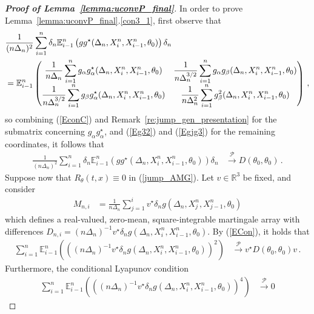 \documentclass[11pt,a4paper]{article}
\newcommand{\xtl}{{X^n_{i-1}}}
\newcommand{\xtr}{X^n_i}
\newcommand{\xtlj}{{X^n_{j-1}}}
\newcommand{\xtrj}{X^n_j}
\newcommand{\thetan}{{\theta_0}}
\newcommand{\EE}{{\mathbb E}}
\newcommand{\RR}{{\mathbb R}}
\newcommand{\pp}{{\mathcal{P}}}
\numberwithin{equation}{section}
\numberwithin{theorem}{section}
\begin{document}
\begin{proof}[\textbf{Proof of Lemma~\ref{lemma:uconvP_final}}]
In order to prove Lemma~\ref{lemma:uconvP_final}.\ref{con3_1}, first observe that
\begin{align*}
&\hspace{0mm} \frac{1}{(n\Delta_n)^2}\sum_{i=1}^n \delta_n \EE^n_{i-1}\left( gg^\star (\Delta_n,\xtr, \xtl,
  \thetan)\right) \delta_n\\
&= \EE^n_{i-1}\begin{pmatrix} \displaystyle \frac{1}{n\Delta_n}  \sum_{i=1}^n   g_\alpha   g_\alpha^\star  (\Delta_n,\xtr, \xtl,
  \thetan) & \displaystyle \frac{1}{n\Delta_n^{3/2}} \sum_{i=1}^n  g_\alpha   g_\beta  (\Delta_n,\xtr, \xtl,
  \thetan)\\
\displaystyle \frac{1}{n\Delta_n^{3/2}}   \sum_{i=1}^n   g_\beta g_\alpha^\star  (\Delta_n,\xtr, \xtl,
  \thetan) & \displaystyle \frac{1}{n\Delta_n^2} \sum_{i=1}^n   g_\beta^2  (\Delta_n,\xtr, \xtl,
  \thetan)
\end{pmatrix}   \,,
\end{align*}
%
so combining (\ref{EconC}) and Remark~\ref{re:jump_gen_presentation} for the submatrix concerning $g_\alpha g_\alpha^\star $, and (\ref{Eg32}) and (\ref{Egjg3}) for the remaining coordinates, it follows that
\begin{align}
\frac{1}{(n\Delta_n)^2}\sum_{i=1}^n \delta_n\EE^n_{i-1}\left( gg^\star (\Delta_n,\xtr, \xtl,
  \thetan)\right) \delta_n
  &\overset{\pp}{\longrightarrow} D(\thetan, \thetan)\,.
\label{ECon}
\end{align}
%
Suppose now that $R_\theta(t,x) \equiv 0$ in (\ref{jump_AMG}). Let
$v\in \RR^3$ be fixed, and consider
\begin{align}
M_{n,i} &= \frac{1}{n\Delta_n} \sum_{j=1}^i v^\star \delta_n g(\Delta_n,\xtrj,\xtlj,
          \thetan)
          \label{M2}
\end{align}
which defines a real-valued, zero-mean, square-integrable martingale array with differences $D_{n,i}
= (n\Delta_n)^{-1} v^\star \delta_ng(\Delta_n,\xtr,\xtl,
\thetan)$. By (\ref{ECon}), it holds that
\begin{align*}
\sum_{i=1}^n  \EE^n_{i-1}\left(
  \left((n\Delta_n)^{-1}v^\star \delta_ng (\Delta_n,\xtr,\xtl,
\thetan)\right)^2\right)
&\overset{\pp}{\longrightarrow} v^\star  D(\thetan, \thetan) v\,.
\end{align*}
%
Furthermore, the conditional Lyapunov condition
\begin{align}
\sum_{i=1}^n \EE^n_{i-1}\left( \left((n\Delta_n)^{-1}v^\star \delta_n
    g(\Delta_n,\xtr,\xtl, \thetan)\right)^4 \right)
&\overset{\pp}{\longrightarrow} 0

\end{align}
\end{proof}
\end{document}
